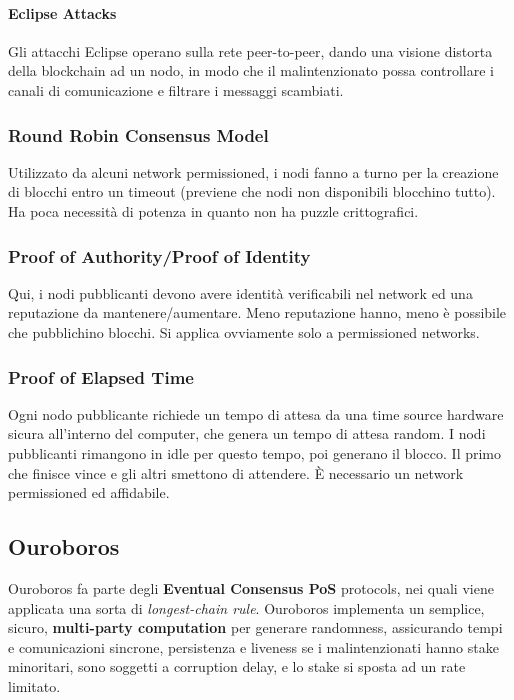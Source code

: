 \documentclass[11pt]{article}
\begin{document}
\paragraph{Eclipse Attacks} 
Gli attacchi Eclipse operano sulla rete peer-to-peer, dando una visione distorta della blockchain ad un nodo, in modo che il malintenzionato possa controllare i canali di comunicazione e filtrare i messaggi scambiati. 
\subsubsection{Round Robin Consensus Model}
Utilizzato da alcuni network permissioned, i nodi fanno a turno per la creazione di blocchi entro un timeout (previene che nodi non disponibili blocchino tutto). Ha poca necessità di potenza in quanto non ha puzzle crittografici. 
\subsubsection{Proof of Authority/Proof of Identity}
Qui, i nodi pubblicanti devono avere identità verificabili nel network ed una reputazione da mantenere/aumentare. Meno reputazione hanno, meno è possibile che pubblichino blocchi. Si applica ovviamente solo a permissioned networks. 
\subsubsection{Proof of Elapsed Time}
Ogni nodo pubblicante richiede un tempo di attesa da una time source hardware sicura all'interno del computer, che genera un tempo di attesa random. I nodi pubblicanti rimangono in idle per questo tempo, poi generano il blocco. Il primo che finisce vince e gli altri smettono di attendere. È necessario un network permissioned ed affidabile.

\subsection{Ouroboros}
Ouroboros fa parte degli \textbf{Eventual Consensus PoS} protocols, nei quali viene applicata una sorta di \textit{longest-chain rule}. Ouroboros implementa un semplice, sicuro, \textbf{multi-party computation} per generare randomness, assicurando tempi e comunicazioni sincrone, persistenza e liveness se i malintenzionati hanno stake minoritari, sono soggetti a corruption delay, e lo stake si sposta ad un rate limitato. 
\end{document}
